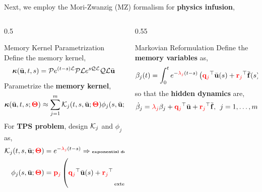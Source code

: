 \begin{frame}{\small Next, we employ the Mori-Zwanzig (MZ) formalism for \textbf{physics infusion},}
    \footnotesize
    \begin{columns}
        \begin{column}{0.5\textwidth}
            \begin{graybox}{Memory Kernel Parametrization}
                Define the memory kernel,
                \begin{equation*}
                    \boldsymbol{\kappa}(\bar{\mathbf{u}},t,s) = {\mathcal{P}} e^{(t-s){\mathcal{L}}}{\mathcal{P}}{\mathcal{L}} e^{s{\mathcal{Q}}{\mathcal{L}}}{\mathcal{Q}}{\mathcal{L}}\bar{\mathbf{u}}
                \end{equation*}
                Parametrize the \textbf{memory kernel},
                \begin{equation*}
                    \boldsymbol{\kappa}(\bar{\mathbf{u}},t,s;\textcolor{red}{\boldsymbol{\Theta}}) \approx \sum_{j=1}^{m} {\mathcal{K}}_j(t,s,\bar{\mathbf{u}};\textcolor{red}{\boldsymbol{\Theta}})\phi_j(s,\bar{\mathbf{u}};\textcolor{red}{\boldsymbol{\Theta}})
                \end{equation*}
                For \textbf{TPS problem}, design ${\mathcal{K}}_j$ and $\phi_j$ as,
                \begin{align*}
                    {\mathcal{K}}_j(t,s,\bar{\mathbf{u}};\textcolor{red}{\boldsymbol{\Theta}}) &= e^{-\textcolor{red}{\lambda_j}(t-s)}\Rightarrow\text{{\tiny \textbf{exponential decay!}}}\\
                    \phi_j(s,\bar{\mathbf{u}};\textcolor{red}{\boldsymbol{\Theta}}) &= \textcolor{red}{{\mathbf{p}}_j}\left(\textcolor{red}{{\mathbf{q}}_j}^\top\bar{{\mathbf{u}}}(s) + \textcolor{red}{{\mathbf{r}}_j}^\top\underbrace{\bar{{\mathbf{f}}}(s)}_{\text{external forcing}} \right)
                \end{align*}
            \end{graybox}
        \end{column}
        \hspace*{-0.1in}
        \begin{column}{0.55\textwidth}
            \begin{graybox}{Markovian Reformulation}
                Define the \textbf{memory variables} as,
                \begin{equation*}
                    \beta_j(t) = \int_0^t e^{-\textcolor{red}{\lambda_j}(t-s)} \left(\textcolor{red}{{\mathbf{q}}_j}^\top\bar{{\mathbf{u}}}(s) + \textcolor{red}{{\mathbf{r}}_j}^\top\bar{{\mathbf{f}}}(s)\right) ds
                \end{equation*}
                so that the \textbf{hidden dynamics} are,
                \begin{equation*}
                    \dot{\beta}_j = \textcolor{red}{\lambda_j}\beta_j + \textcolor{red}{\vq_j}^\top\bar{\vu} + \textcolor{red}{\vr_j}^\top\bar{\vf},\:\: j=1,\dots,m

\end{equation*}
\end{graybox}
\end{column}
\end{columns}
\end{frame}
